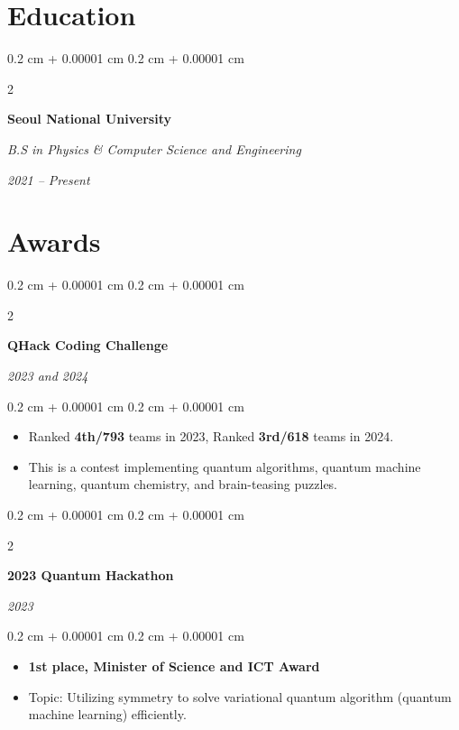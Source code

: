 \documentclass[10pt, letterpaper]{article}
\newenvironment{highlights}{
    \begin{itemize}[
        topsep=0.10 cm,
        parsep=0.10 cm,
        partopsep=0pt,
        itemsep=0pt,
        leftmargin=0.4 cm + 10pt
    ]
}{
    \end{itemize}
} %
\newenvironment{onecolentry}{
    \begin{adjustwidth}{
        0.2 cm + 0.00001 cm
    }{
        0.2 cm + 0.00001 cm
    }
}{
    \end{adjustwidth}
} %
\newenvironment{twocolentry}[2][]{
    \onecolentry
    \def\secondColumn{#2}
    \setcolumnwidth{\fill, 4.5 cm}
    \begin{paracol}{2}
}{
    \switchcolumn \raggedleft \secondColumn
    \end{paracol}
    \endonecolentry
} %
\let\hrefWithoutArrow\href
\renewcommand{\href}[2]{\hrefWithoutArrow{#1}{\ifthenelse{\equal{#2}{}}{ }{#2 }\raisebox{.15ex}{\footnotesize \faExternalLink*}}}
\begin{document}
\section{Education}

\begin{twocolentry}{
        \textit{2021 – Present}
    }
    \textbf{Seoul National University}

    \textit{B.S in Physics \& Computer Science and Engineering}
\end{twocolentry}


\section{Awards}

\begin{twocolentry}{
        \textit{2023 and 2024}
    }
    \textbf{QHack Coding Challenge \href{https://qhack.ai}{[link]}}
\end{twocolentry}

\vspace{0.10 cm}
\begin{onecolentry}
    \begin{highlights}
        \item Ranked \textbf{4th/793} teams in 2023, Ranked \textbf{3rd/618} teams in 2024.
        \item This is a contest implementing quantum algorithms, quantum machine learning, quantum chemistry, and brain-teasing puzzles.
    \end{highlights}
\end{onecolentry}

\vspace{0.2 cm}

\begin{twocolentry}{
        \textit{2023}
    }
    \textbf{2023 Quantum Hackathon \href{https://qhackathon.kr/}{[link]}}
\end{twocolentry}

\vspace{0.10 cm}
\begin{onecolentry}
    \begin{highlights}
        \item \textbf{1st place, Minister of Science and ICT Award}
        \item Topic: Utilizing symmetry to solve variational quantum algorithm (quantum machine learning) efficiently.
    \end{highlights}
\end{onecolentry}
\end{document}

